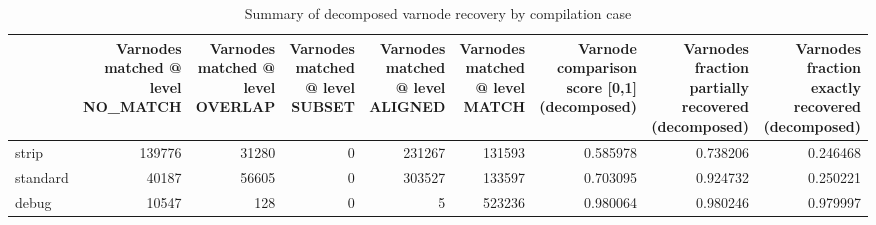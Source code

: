 \begin{table}
\centering
\caption{Summary of decomposed varnode recovery by compilation case}
\label{table:opts-varnodes-summary-decomposed}
\begin{tabular}{lrrrrrrrr}
\toprule
{} &  Varnodes matched @ level NO\_MATCH &  Varnodes matched @ level OVERLAP &  Varnodes matched @ level SUBSET &  Varnodes matched @ level ALIGNED &  Varnodes matched @ level MATCH &  Varnode comparison score [0,1] (decomposed) &  Varnodes fraction partially recovered (decomposed) &  Varnodes fraction exactly recovered (decomposed) \\
\midrule
strip    &                             139776 &                             31280 &                                0 &                            231267 &                          131593 &                                     0.585978 &                                           0.738206 &                                          0.246468 \\
standard &                              40187 &                             56605 &                                0 &                            303527 &                          133597 &                                     0.703095 &                                           0.924732 &                                          0.250221 \\
debug    &                              10547 &                               128 &                                0 &                                 5 &                          523236 &                                     0.980064 &                                           0.980246 &                                          0.979997 \\
\bottomrule
\end{tabular}
\end{table}
